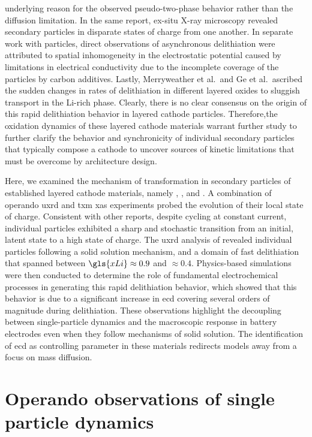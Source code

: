 \documentclass{article}
\begin{document}
underlying reason for the observed pseudo-two-phase behavior rather
than the  diffusion limitation. In the same report, ex-situ
X-ray microscopy revealed secondary particles in disparate states of
charge from one another. In separate work with \nmc[532]{}
particles,\cite{zhao2022} direct observations of asynchronous
delithiation were attributed to spatial inhomogeneity in the
electrostatic potential caused by limitations in electrical
conductivity due to the incomplete coverage of the particles by carbon
additives. Lastly, Merryweather et al.\cite{rao2021}\ and Ge et
al.\cite{wang2020-6}\ ascribed the sudden changes in rates of
delithiation in different layered oxides to sluggish 
transport in the Li-rich phase. Clearly, there is no clear consensus
on the origin of this rapid delithiation behavior in layered cathode
particles. Therefore,the oxidation dynamics of these layered cathode
materials warrant further study to further clarify the behavior and
synchronicity of individual secondary particles that typically compose
a cathode to uncover sources of kinetic limitations that must be
overcome by architecture design.

Here, we examined the mechanism of transformation in secondary
particles of established layered cathode materials, namely \nca{},
\nmc[333]{}, and \nmc[532]{}. A combination of operando \gls{uxrd} and
\gls{txm} \gls{xas} experiments probed the evolution of their local
state of charge. Consistent with other reports, despite cycling at
constant current, individual particles exhibited a sharp and
stochastic transition from an initial, latent state to a high state of
charge. The \gls{uxrd} analysis of \nca{} revealed individual
particles following a solid solution mechanism, and a domain of fast
delithiation that spanned between $\gls{xLi} \approx 0.9$ and $\approx
0.4$.  Physics-based simulations were then conducted to determine the
role of fundamental electrochemical processes in generating this rapid
delithiation behavior, which showed that this behavior is due to a
significant increase in \gls{ecd} covering several orders of magnitude
during delithiation. These observations highlight the decoupling
between single-particle dynamics and the macroscopic response in
battery electrodes even when they follow mechanisms of solid
solution. The identification of \gls{ecd} as controlling parameter in
these materials redirects models away from a focus on mass diffusion.

\section{Operando observations of single particle dynamics}
\end{document}
